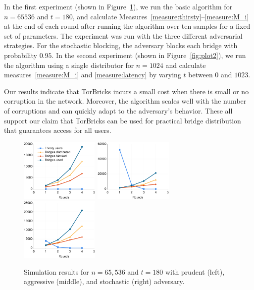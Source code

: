 \documentclass[letterpaper,twocolumn,10pt]{article}
\newcommand{\bricks}{}
\def\bricks/{\mbox{TorBricks}}
\begin{document}
In the first experiment (shown in Figure~\ref{fig:plot1}), we run the basic algorithm for ${n=65536}$ and ${t=180}$, and calculate Measures~\ref{measure:thirsty}--\ref{measure:M_i} at the end of each round after running the algorithm over ten samples for a fixed set of parameters. The experiment was run with the three different adversarial strategies. For the stochastic blocking, the adversary blocks each bridge with probability $0.95$. %
In the second experiment (shown in Figure~\ref{fig:plot2}), we run the algorithm using a single distributor for ${n=1024}$ and calculate measures~\ref{measure:M_i} and \ref{measure:latency} by varying $t$ between $0$ and $1023$.

Our results indicate that \bricks/ incurs a small cost when there is small or no corruption in the network. Moreover, the algorithm scales well with the number of corruptions and can quickly adapt to the adversary's behavior. These all support our claim that \bricks/ can be used for practical bridge distribution that guarantees access for all users.

\begin{figure}[t]
	\hspace{-0.8em}\includegraphics[width=0.34\textwidth]{images/plot-prudent-65536.eps}
	\hspace{-0.5em}\includegraphics[width=0.34\textwidth]{images/plot-aggressive-65536.eps}
	\hspace{-0.5em}\includegraphics[width=0.34\textwidth]{images/plot-stochastic-65536.eps}
	\caption{Simulation results for ${n=65,536}$ and ${t=180}$ with prudent (left), aggressive (middle), and stochastic (right) adversary.}
	\label{fig:plot1} 
\end{figure}
\end{document}
